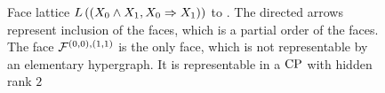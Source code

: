 \begin{example}
    \begin{figure}
        \begin{center}
            
        \end{center}
        \caption{
            Face lattice $L\left((X_{0} \land X_{1},X_{0} \Rightarrow X_{1})\right)$ to .
            The directed arrows represent inclusion of the faces, which is a partial order of the faces.
            The face \textcolor{\concolor}{$\mathcal{F}^{(0,0),(1,1)}$} is the only face, which is not representable by an elementary hypergraph.
            It is representable in a $\mathrm{CP}$ with hidden rank $2$
        }\label{fig:latticeNonelHlnstat}
    \end{figure}

\end{example}
